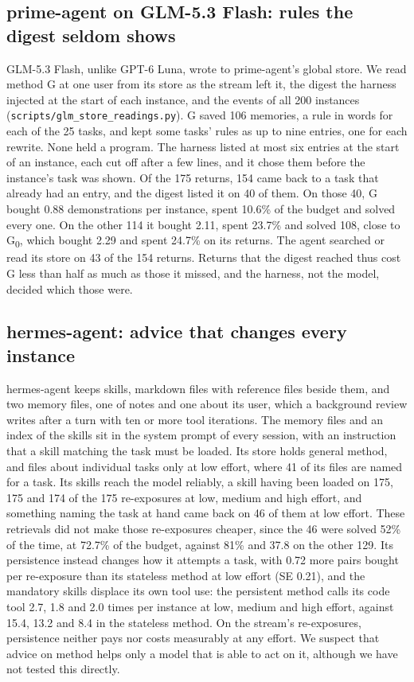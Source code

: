 \subsection{prime-agent on GLM-5.3 Flash: rules the digest seldom shows}
\label{app:persist-glm}

GLM-5.3 Flash, unlike GPT-6 Luna, wrote to prime-agent's global store. We read method G at one user from its store as the stream left it, the digest the harness injected at the start of each instance, and the events of all 200 instances (\texttt{scripts/glm\_store\_readings.py}). G saved 106 memories, a rule in words for each of the 25 tasks, and kept some tasks' rules as up to nine entries, one for each rewrite. None held a program. The harness listed at most six entries at the start of an instance, each cut off after a few lines, and it chose them before the instance's task was shown. Of the 175 returns, 154 came back to a task that already had an entry, and the digest listed it on 40 of them. On those 40, G bought 0.88 demonstrations per instance, spent 10.6\% of the budget and solved every one. On the other 114 it bought 2.11, spent 23.7\% and solved 108, close to G\textsubscript{0}, which bought 2.29 and spent 24.7\% on its returns. The agent searched or read its store on 43 of the 154 returns. Returns that the digest reached thus cost G less than half as much as those it missed, and the harness, not the model, decided which those were.

\subsection{hermes-agent: advice that changes every instance}
\label{app:persist-hermes}

hermes-agent keeps skills, markdown files with reference files beside them, and two memory files, one of notes and one about its user, which a background review writes after a turn with ten or more tool iterations. The memory files and an index of the skills sit in the system prompt of every session, with an instruction that a skill matching the task must be loaded. Its store holds general method, and files about individual tasks only at low effort, where 41 of its files are named for a task. Its skills reach the model reliably, a skill having been loaded on 175, 175 and 174 of the 175 re-exposures at low, medium and high effort, and something naming the task at hand came back on 46 of them at low effort. These retrievals did not make those re-exposures cheaper, since the 46 were solved 52\% of the time, at 72.7\% of the budget, against 81\% and 37.8 on the other 129. Its persistence instead changes how it attempts a task, with 0.72 more pairs bought per re-exposure than its stateless method at low effort (SE 0.21), and the mandatory skills displace its own tool use: the persistent method calls its code tool 2.7, 1.8 and 2.0 times per instance at low, medium and high effort, against 15.4, 13.2 and 8.4 in the stateless method. On the stream's re-exposures, persistence neither pays nor costs measurably at any effort. We suspect that advice on method helps only a model that is able to act on it, although we have not tested this directly.

